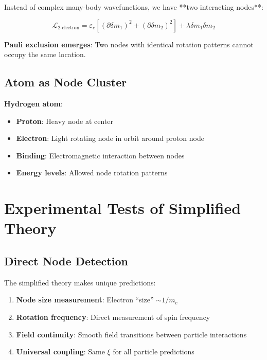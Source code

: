 \documentclass[12pt,a4paper]{article}
\newcommand{\Lag}{\mathcal{L}}
\newcommand{\deltam}{\delta m}
\newcommand{\xipar}{\xi}
\theoremstyle{definition}
\theoremstyle{remark}
\begin{document}
	Instead of complex many-body wavefunctions, we have **two interacting nodes**:
	
	\begin{equation}
		\Lag_{\text{2-electron}} = \varepsilon_e [(\partial \deltam_1)^2 + (\partial \deltam_2)^2] + \lambda \deltam_1 \deltam_2
		\label{eq:two_electron}
	\end{equation}
	
	\textbf{Pauli exclusion emerges}: Two nodes with identical rotation patterns cannot occupy the same location.
	
	\subsection{Atom as Node Cluster}
	
	\textbf{Hydrogen atom}: 
	\begin{itemize}
		\item \textbf{Proton}: Heavy node at center
		\item \textbf{Electron}: Light rotating node in orbit around proton node
		\item \textbf{Binding}: Electromagnetic interaction between nodes
		\item \textbf{Energy levels}: Allowed node rotation patterns
	\end{itemize}
	
	\section{Experimental Tests of Simplified Theory}
	
	\subsection{Direct Node Detection}
	
	The simplified theory makes unique predictions:
	
	\begin{enumerate}
		\item \textbf{Node size measurement}: Electron ``size'' $\sim 1/m_e$
		\item \textbf{Rotation frequency}: Direct measurement of spin frequency
		\item \textbf{Field continuity}: Smooth field transitions between particle interactions
		\item \textbf{Universal coupling}: Same $\xipar$ for all particle predictions
	\end{enumerate}
	
\end{document}
